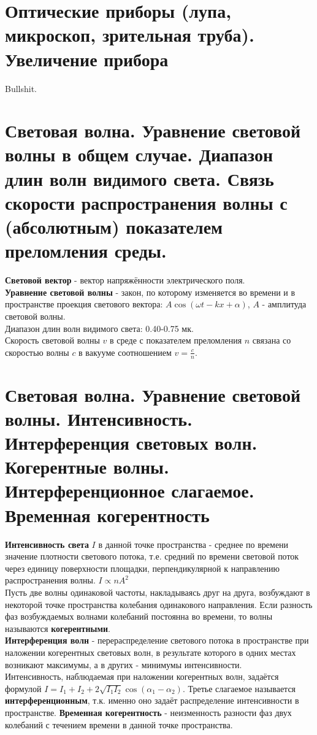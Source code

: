 \documentclass[14pt]{extarticle}
\begin{document}
\section{Оптические приборы (лупа, микроскоп, зрительная труба). Увеличение прибора}
Bullshit.
\section{Световая волна. Уравнение световой волны в общем случае. 
Диапазон длин волн видимого света. Связь скорости распространения волны 
с (абсолютным) показателем преломления среды.}
\textbf{Световой вектор} - вектор напряжённости электрического поля.\\
\textbf{Уравнение световой волны} - закон, по которому изменяется
во времени и в пространстве проекция светового вектора: 
$A \cos (\omega t - kx + \alpha)$, $A$ - амплитуда световой волны.\\
Диапазон длин волн видимого света: 0.40-0.75 мк.\\
Скорость световой волны $v$ в среде с показателем преломления $n$ 
связана со скоростью волны $c$ в вакууме соотношением 
$v = \frac{c}{n}$.
\section{Световая волна. Уравнение световой волны. Интенсивность. Интерференция 
световых волн. Когерентные волны. Интерференционное слагаемое. 
Временная когерентность}
\textbf{Интенсивность света} $I$ в данной точке пространства - 
среднее по времени значение плотности светового потока, т.е. средний по 
времени световой поток через единицу поверхности площадки,
перпендикулярной к направлению распространения волны. $I \propto nA^2$\\
Пусть две волны одинаковой частоты, накладываясь друг на друга, возбуждают
в некоторой точке пространства колебания одинакового направления. 
Если разность фаз возбуждаемых волнами колебаний постоянна во времени, то
волны называются \textbf{когерентными}.\\
\textbf{Интерференция волн} - перераспределение 
светового потока в пространстве при 
наложении когерентных световых волн, в результате которого в одних местах 
возникают максимумы, а в других - минимумы интенсивности.\\
Интенсивность, наблюдаемая при наложении когерентных волн, задаётся формулой
$I = I_1 + I_2 + 2 \sqrt{I_1 I_2} \cos(\alpha_1 - \alpha_2)$. Третье слагаемое
называется \textbf{интерференционным}, т.к. именно оно задаёт распределение
интенсивности в пространстве. 
\textbf{Временная когерентность} - неизменность разности фаз двух колебаний 
с течением времени в данной точке пространства.\\
\end{document}
